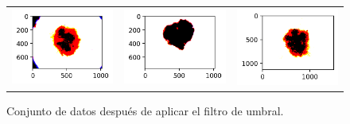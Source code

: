 \begin{figure}[!b]
\begin{tabular}{ccc}
        \includegraphics[width=4cm]{../Plots/THR/filtered_12.png} &
        \includegraphics[width=4cm]{../Plots/THR/filtered_13.png} &
        \includegraphics[width=4cm]{../Plots/THR/filtered_14.png} \\


    \end{tabular}        
    \caption{Conjunto de datos después de aplicar el filtro de umbral.}
    \label{fig:output_1}
\end{figure}


